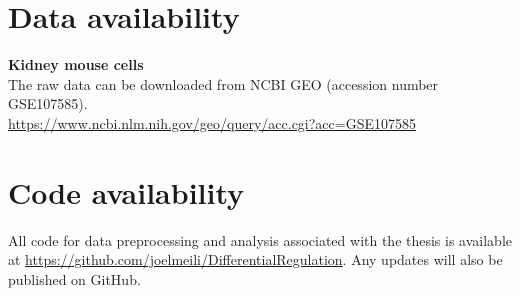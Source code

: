 \section{Data availability}

\noindent\textbf{Kidney mouse cells} \\
The raw data can be downloaded from NCBI GEO (accession number GSE107585). \\ 
\url{https://www.ncbi.nlm.nih.gov/geo/query/acc.cgi?acc=GSE107585} \\

\section{Code availability}
All code for data preprocessing and analysis associated with the thesis is available at \url{https://github.com/joelmeili/DifferentialRegulation}. Any updates will also be published on GitHub.
